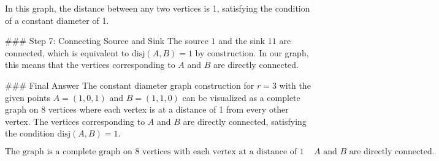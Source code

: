 In this graph, the distance between any two vertices is 1, satisfying the condition of a constant diameter of 1.

### Step 7: Connecting Source and Sink
The source \( 1 \) and the sink \( 11 \) are connected, which is equivalent to \(\text{disj}(A, B) = 1\) by construction. In our graph, this means that the vertices corresponding to \( A \) and \( B \) are directly connected.

### Final Answer
The constant diameter graph construction for \( r = 3 \) with the given points \( A = (1, 0, 1) \) and \( B = (1, 1, 0) \) can be visualized as a complete graph on 8 vertices where each vertex is at a distance of 1 from every other vertex. The vertices corresponding to \( A \) and \( B \) are directly connected, satisfying the condition \(\text{disj}(A, B) = 1\).

\[
\boxed{\text{The graph is a complete graph on 8 vertices with each vertex at a distance of 1 from every other vertex, and the vertices corresponding to } A \text{ and } B \text{ are directly connected.}}
\]